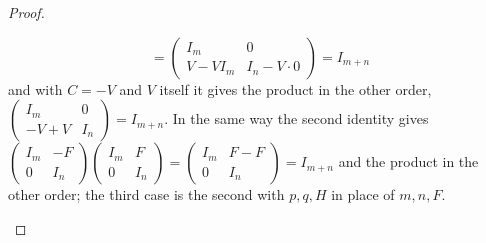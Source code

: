 \documentclass[12pt]{article}
\theoremstyle{definition}
\begin{document}
\begin{proof}
\begin{itemize}
\[=\begin{pmatrix}I_m&0\\V-VI_m&I_n-V\cdot0\end{pmatrix}=I_{m+n}
\]
and with \(C=-V\) and \(V\) itself it gives the product in the other order,
\(\left(\begin{smallmatrix}I_m&0\\-V+V&I_n\end{smallmatrix}\right)=I_{m+n}\). In the same way the
second identity gives
\(\left(\begin{smallmatrix}I_m&-F\\0&I_n\end{smallmatrix}\right)\left(\begin{smallmatrix}I_m&F\\0&I_n\end{smallmatrix}\right)
=\left(\begin{smallmatrix}I_m&F-F\\0&I_n\end{smallmatrix}\right)=I_{m+n}\) and the product in the
other order; the third case is the second with \(p,q,H\) in place of \(m,n,F\).\qedhere
\end{itemize}
\end{proof}
\end{document}
